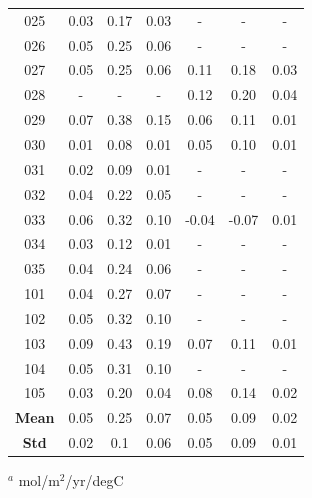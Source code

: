 \documentclass[12pt]{article}
\begin{document}
\begin{table}[!h]
\begin{tabular}{c c c c | c c c}
		025 &   0.03 &     0.17 &       0.03 &    - &      - &        - \\
		026 &   0.05 &     0.25 &       0.06 &    - &      - &        - \\
		027 &   0.05 &     0.25 &       0.06 &   0.11 &     0.18 &       0.03 \\
		028 &    - &      - &        - &   0.12 &     0.20 &       0.04 \\
		029 &   0.07 &     0.38 &       0.15 &   0.06 &     0.11 &       0.01 \\
		030 &   0.01 &     0.08 &       0.01 &   0.05 &     0.10 &       0.01 \\
		031 &   0.02 &     0.09 &       0.01 &    - &      - &        - \\
		032 &   0.04 &     0.22 &       0.05 &    - &      - &        - \\
		033 &   0.06 &     0.32 &       0.10 &  -0.04 &    -0.07 &       0.01 \\
		034 &   0.03 &     0.12 &       0.01 &    - &      - &        - \\
		035 &   0.04 &     0.24 &       0.06 &    - &      - &        - \\
		101 &   0.04 &     0.27 &       0.07 &    - &      - &        - \\
		102 &   0.05 &     0.32 &       0.10 &    - &      - &        - \\
		103 &   0.09 &     0.43 &       0.19 &   0.07 &     0.11 &       0.01 \\
		104 &   0.05 &     0.31 &       0.10 &    - &      - &        - \\
		105 &   0.03 &     0.20 &       0.04 &   0.08 &     0.14 &       0.02 \\
		\bottomrule
		\textbf{Mean} & 0.05 & 0.25 & 0.07 & 0.05 & 0.09 & 0.02 \\
		\textbf{Std} & 0.02 & 0.1 & 0.06 & 0.05 & 0.09 & 0.01
	\end{tabular}
	\begin{tablenotes}
		\centering
		\item $^{a}$ mol/m$^{2}$/yr/degC
	\end{tablenotes}
	\label{tab:enso-atlantic}
\end{table}
\end{document}
